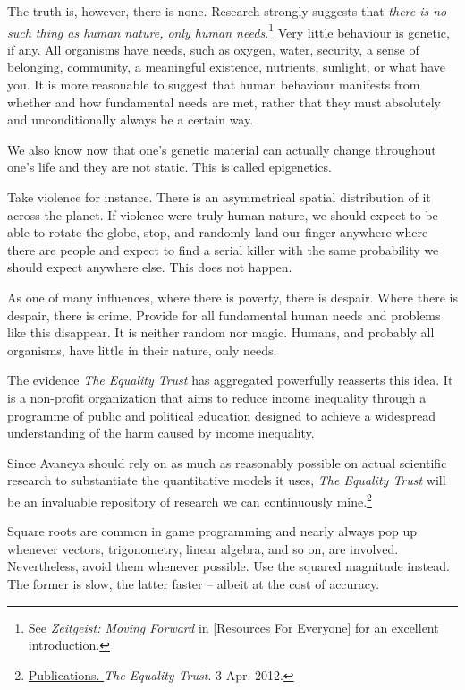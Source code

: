 The truth is, however, there is none. Research strongly suggests that {\it there is no such thing as human nature, only human needs}.\footnote{See {\it Zeitgeist: Moving Forward} in [Resources For Everyone] for an excellent introduction.} Very little behaviour is genetic, if any. All organisms have needs, such as oxygen, water, security, a sense of belonging, community, a meaningful existence, nutrients, sunlight, or what have you. It is more reasonable to suggest that human behaviour manifests from whether and how fundamental needs are met, rather that they must absolutely and unconditionally always be a certain way.

We also know now that one's genetic material can actually change throughout one's life and they are not static. This is called epigenetics.

Take violence for instance. There is an asymmetrical spatial distribution of it across the planet. If violence were truly human nature, we should expect to be able to rotate the globe, stop, and randomly land our finger anywhere where there are people and expect to find a serial killer with the same  probability we should expect anywhere else. This does not happen. 

As one of many influences, where there is poverty, there is despair. Where there is despair, there is crime. Provide for all fundamental human needs and problems like this disappear. It is neither random nor magic. Humans, and probably all organisms, have little in their nature, only needs.

The evidence {\it The Equality Trust} has aggregated powerfully reasserts this idea. It is a non-profit organization that aims to reduce income inequality through a programme of public and political education designed to achieve a widespread understanding of the harm caused by income inequality.

Since Avaneya should rely on as much as reasonably possible on actual scientific research to substantiate the quantitative models it uses, {\it The Equality Trust} will be an invaluable repository of research we can continuously mine.\footnote{\href{http://www.equalitytrust.org.uk/resources/publications}{Publications. }{\it The Equality Trust}. 3 Apr. 2012.}

Square roots are common in game programming and nearly always pop up whenever vectors, trigonometry, linear algebra, and so on, are involved. Nevertheless, avoid them whenever possible. Use the squared magnitude instead. The former is slow, the latter faster -- albeit at the cost of accuracy.

